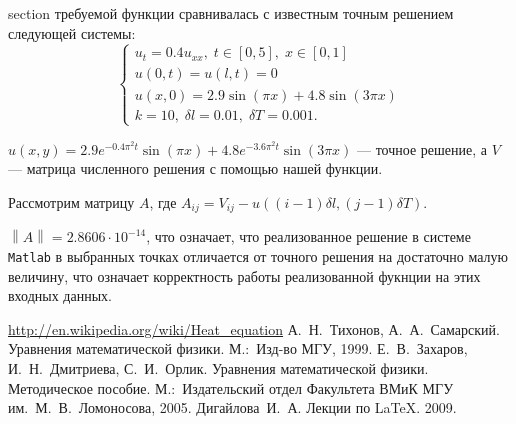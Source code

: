 \documentclass[11pt]{article}
\newcommand\norm[1]{\left\lVert#1\right\rVert}
\begin{document}
section требуемой функции сравнивалась с известным точным решением следующей системы:
$$
\left\{
\begin{aligned}
u_t = 0.4u_{xx}, \; t \in [0, 5], \; x \in [0, 1] \\
u(0, t) = u(l, t) = 0 \\
u(x, 0) = 2.9 \sin(\pi x) + 4.8 \sin(3 \pi x) \\
k = 10, \; \delta l = 0.01, \; \delta T = 0.001.
\end{aligned}
\right.
$$

$ u(x, y) = 2.9 e^{-0.4 \pi^2 t} \sin(\pi x) + 4.8 e^{-3.6 \pi^2 t} \sin(3 \pi x) $ --- точное решение, а $V$ --- матрица численного решения с помощью нашей функции.

Рассмотрим матрицу $A$, где $A_{ij} = V_{ij} - u((i - 1) \delta l, (j - 1) \delta T)$.

$\norm{A} = 2.8606 \cdot 10^{-14}$, что означает, что реализованное решение в системе \texttt{Matlab} в выбранных точках отличается от точного решения на достаточно малую величину, что означает корректность работы реализованной фукнции на этих входных данных.

\begin{thebibliography}{99}
	 \url{http://en.wikipedia.org/wiki/Heat_equation}
	 А.~Н.~Тихонов, А.~А.~Самарский. Уравнения математической физики. М.:~Изд-во МГУ, 1999.
	 Е.~В.~Захаров, И.~Н.~Дмитриева, С.~И.~Орлик. Уравнения математической физики. Методическое пособие. М.:~Издательский отдел Факультета ВМиК МГУ им.~М.~В.~Ломоносова, 2005.
	 Дигайлова~И.~А. Лекции по \LaTeX. 2009.
\end{thebibliography}
\end{document}
